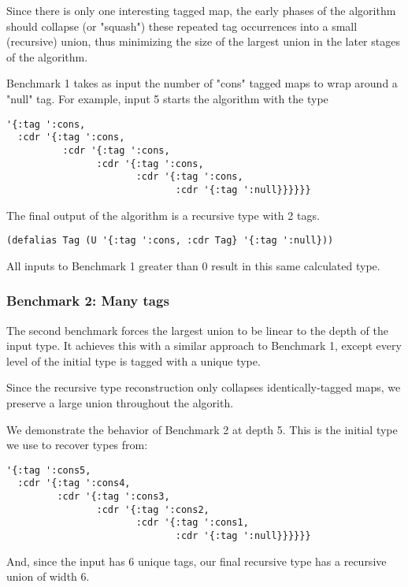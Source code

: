 Since there is only one interesting tagged map, the early phases of the
algorithm should collapse (or "squash") these repeated tag occurrences
into a small (recursive) union, thus minimizing the size of the largest
union in the later stages of the algorithm.

Benchmark 1 takes as input the number of "cons" tagged maps to wrap
around a "null" tag. For example, input 5 starts the algorithm with
the type

\begin{verbatim}
'{:tag ':cons,
  :cdr '{:tag ':cons,
          :cdr '{:tag ':cons,
                :cdr '{:tag ':cons, 
                       :cdr '{:tag ':cons, 
                              :cdr '{:tag ':null}}}}}}
\end{verbatim}

The final output of the algorithm is a recursive type with 2 tags.

\begin{verbatim}
(defalias Tag (U '{:tag ':cons, :cdr Tag} '{:tag ':null}))
\end{verbatim}

All inputs to Benchmark 1 greater than 0 result in this same calculated type.

\subsubsection{Benchmark 2: Many tags}

The second benchmark forces the largest union to be linear to the depth
of the input type. It achieves this with a similar approach to Benchmark 1,
except every level of the initial type is tagged with a unique type.

Since the recursive type reconstruction only collapses identically-tagged
maps, we preserve a large union throughout the algorith.

We demonstrate the behavior of Benchmark 2 at depth 5. This is the initial
type we use to recover types from:

\begin{verbatim}
'{:tag ':cons5,
  :cdr '{:tag ':cons4,
         :cdr '{:tag ':cons3,
                :cdr '{:tag ':cons2, 
                       :cdr '{:tag ':cons1,
                              :cdr '{:tag ':null}}}}}}
\end{verbatim}

And, since the input has 6 unique tags, our final recursive type has a
recursive union of width 6.

